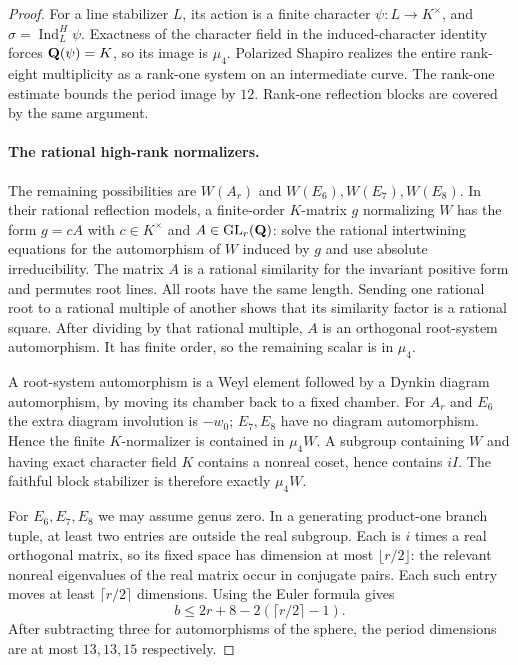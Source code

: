 \begin{proof}
For a line stabilizer $L$, its action is a finite character
$\psi:L\to K^\times$, and $\sigma=\operatorname{Ind}_L^H\psi$.
Exactness of the character field in the induced-character identity forces
$\mathbf Q(\psi)=K$, so its image is $\mu_4$. Polarized Shapiro realizes
the entire rank-eight multiplicity as a rank-one system on an
intermediate curve. The rank-one estimate bounds the period image by $12$.
Rank-one reflection blocks are covered by the same argument.

\paragraph{The rational high-rank normalizers.}
The remaining possibilities are $W(A_r)$ and $W(E_6),W(E_7),W(E_8)$.
In their rational reflection models, a finite-order $K$-matrix $g$
normalizing $W$ has the form $g=cA$ with $c\in K^\times$ and
$A\in\operatorname{GL}_r(\mathbf Q)$: solve the rational intertwining equations for the
automorphism of $W$ induced by $g$ and use absolute irreducibility.
The matrix $A$ is a rational similarity for the invariant positive
form and permutes root lines. All roots have the same length. Sending
one rational root to a rational multiple of another shows that its
similarity factor is a rational square. After dividing by that
rational multiple, $A$ is an orthogonal root-system automorphism.
It has finite order, so the remaining scalar is in $\mu_4$.

A root-system automorphism is a Weyl element followed by a Dynkin
diagram automorphism, by moving its chamber back to a fixed chamber.
For $A_r$ and $E_6$ the extra diagram involution is $-w_0$;
$E_7,E_8$ have no diagram automorphism. Hence the finite $K$-normalizer
is contained in $\mu_4W$. A subgroup containing $W$ and having exact
character field $K$ contains a nonreal coset, hence contains $iI$.
The faithful block stabilizer is therefore exactly $\mu_4W$.

For $E_6,E_7,E_8$ we may assume genus zero. In a generating
product-one branch tuple, at least two entries are outside the real
subgroup. Each is $i$ times a real orthogonal matrix, so its fixed
space has dimension at most $\lfloor r/2\rfloor$: the relevant
nonreal eigenvalues of the real matrix occur in conjugate pairs.
Each such entry moves at least $\lceil r/2\rceil$ dimensions.
Using the Euler formula gives
\[
 b\le2r+8-2(\lceil r/2\rceil-1).
\]
After subtracting three for automorphisms of the sphere, the period
dimensions are at most $13,13,15$ respectively.


\end{proof}
